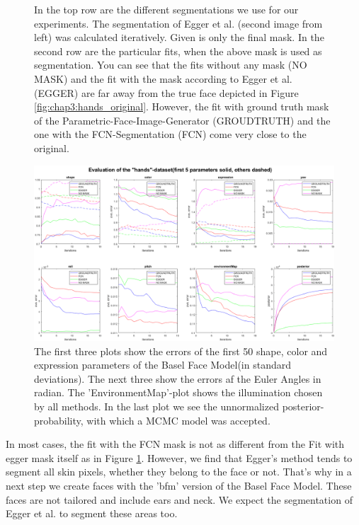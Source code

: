 \begin{figure}
\begin{tabular}{m{1.3cm}|SC|SC|SC|SC}
	\end{tabular}
	\caption{In the top row are the different segmentations we use for our experiments. The segmentation of Egger et al. (second image from left) was calculated iteratively. Given is only the final mask. In the second row are the particular fits, when the above mask is used as segmentation. You can see that the fits without any mask (NO MASK) and the fit with the mask according to Egger et al. (EGGER) are far away from the true face depicted in Figure \ref{fig:chap3:hands_original}. However, the fit with ground truth mask of the Parametric-Face-Image-Generator (GROUDTRUTH) and the one with the FCN-Segmentation (FCN) come very close to the original.}
	\label{fig:chap3:zlabelsandfits}
\end{figure}

\begin{figure}
	\centering
	\includegraphics[angle=90,width=.55\textheight]{Figures/chap3/plot_hands_setting1.png}
	\caption{The first three plots show the errors of the first 50 shape, color and expression parameters of the Basel Face Model(in standard deviations). The next three show the errors af the Euler Angles in radian. The 'EnvironmentMap'-plot shows the illumination chosen by all methods. In the last plot we see the unnormalized posterior-probability, with which a MCMC model was accepted.}
	\label{fig:chap3:plot_hands_setup1}
\end{figure}

\FloatBarrier

In most cases, the fit with the FCN mask is not as different from the Fit with egger mask itself as in Figure \ref{fig:chap3:zlabelsandfits}. However, we find that Egger's method tends to segment all skin pixels, whether they belong to the face or not. That's why in a next step we create faces with the 'bfm' version of the Basel Face Model. These faces are not tailored and include ears and neck. We expect the segmentation of Egger et al. to segment these areas too.

